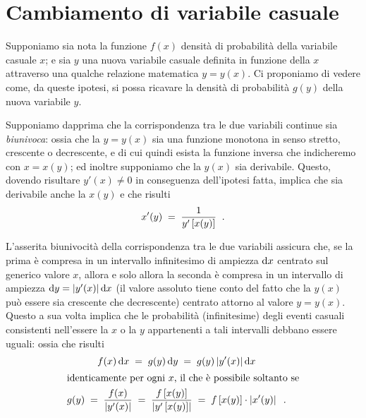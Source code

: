 \section{Cambiamento di variabile casuale}%
Supponiamo sia nota la funzione $f(x)$ densit\`a di
probabilit\`a della variabile casuale $x$; e sia $y$ una
nuova variabile casuale definita in funzione della $x$
attraverso una qualche relazione matematica $y=y(x)$.  Ci
proponiamo di vedere come, da queste ipotesi, si possa
ricavare la densit\`a di probabilit\`a $g(y)$ della nuova
variabile $y$.

Supponiamo dapprima che la corrispondenza tra le due
variabili continue sia \emph{biunivoca}: ossia che la
$y=y(x)$ sia una funzione monotona in senso stretto,
crescente o decrescente, e di cui quindi esista la funzione
inversa che indicheremo con $x = x(y)$; ed inoltre
supponiamo che la $y(x)$ sia derivabile.  Questo, dovendo
risultare $y'(x) \ne 0$ in conseguenza dell'ipotesi fatta,
implica che sia derivabile anche la $x(y)$ e che risulti
\begin{equation*}
  x'(y) \; = \; \frac{1}{y' \left[ x(y) \right]} \;\; .
\end{equation*}

L'asserita biunivocit\`a della corrispondenza tra le due
variabili assicura che, se la prima \`e compresa in un
intervallo infinitesimo di ampiezza $\mathrm{d} x$ centrato sul
generico valore $x$, allora e solo allora la seconda \`e
compresa in un intervallo di ampiezza $\mathrm{d} y = \left| y'(x)
\right| \mathrm{d} x$ (il valore assoluto tiene conto del fatto che
la $y(x)$ pu\`o essere sia crescente che decrescente)
centrato attorno al valore $y=y(x)$.  Questo a sua volta
implica che le probabilit\`a (infinitesime) degli eventi
casuali consistenti nell'essere la $x$ o la $y$ appartenenti
a tali intervalli debbano essere uguali: ossia che risulti
\begin{gather}
  f(x) \, \mathrm{d} x \; = \; g(y) \, \mathrm{d} y \; = \; g(y)
    \left| y'(x) \right| \mathrm{d} x \notag \\
  \intertext{identicamente per ogni $x$, il che \`e
    possibile soltanto se}
  g(y) \; = \; \frac{f(x)}{\left| y'(x) \right|} \; =
    \; \frac{f \left[ x(y) \right]}{\left| y' \left[
    x(y) \right] \right|} \; = \; f \left[ x(y) \right]
    \cdot \left| x'(y) \right| \;\; . \label{eq:6.cavaun}
\end{gather}


